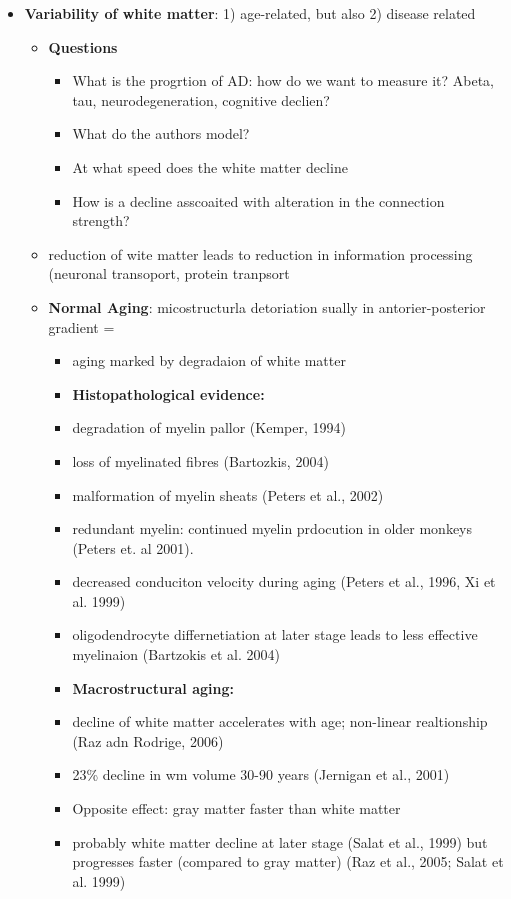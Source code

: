 \documentclass[fleqn]{article}\usepackage{caption}
\begin{document}
\begin{itemize}
\item \textbf{Variability of white matter}: 1) age-related, but also 2) disease related
\begin{itemize}
\item \textbf{Questions}
\begin{itemize}
\item What is the progrtion of AD: how do we want to measure it? Abeta, tau, neurodegeneration, cognitive declien?
\item What do the authors model?
\item At what speed does the white matter decline
\item How is a decline asscoaited with alteration in the connection strength?
\end{itemize}
\item reduction of wite matter leads to reduction in information processing (neuronal transoport, protein tranpsort
\item  \textbf{Normal Aging}: micostructurla detoriation sually in antorier-posterior gradient =
\begin{itemize}
\item aging marked by degradaion of white matter
\item \textbf{Histopathological evidence:}
\item degradation of myelin pallor (Kemper, 1994)
\item loss of myelinated fibres (Bartozkis, 2004)
\item malformation of myelin sheats (Peters et al., 2002)
\item redundant myelin: continued myelin prdocution in older monkeys (Peters et. al 2001). 
\item decreased conduciton velocity during aging (Peters et al., 1996, Xi et al. 1999)
\item oligodendrocyte differnetiation at later stage leads to less effective myelinaion  (Bartzokis et al. 2004)
\item \textbf{Macrostructural aging:}
\item decline of white matter accelerates with age; non-linear realtionship (Raz adn Rodrige, 2006)
\item 23\% decline in wm volume 30-90 years (Jernigan et al., 2001) 
\item Opposite effect: gray matter faster than white matter
\item probably white matter decline at later stage (Salat et al., 1999) but progresses faster (compared to gray matter) (Raz et al., 2005; Salat et al. 1999)

\end{itemize}
\end{itemize}
\end{itemize}
\end{document}
